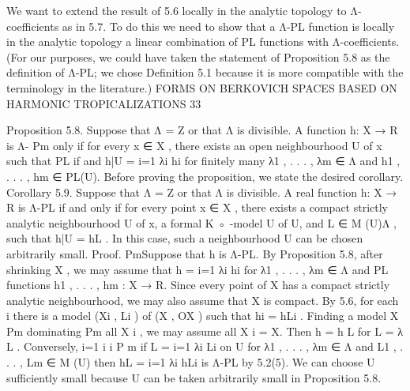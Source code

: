\documentclass[
  10pt,
]{article}
\newenvironment{Shaded}{}{}
\newcommand{\NormalTok}[1]{#1}
\begin{document}
\begin{Shaded}
\begin{Highlighting}[]
\NormalTok{   We want to extend the result of 5.6 locally in the analytic topology to Λ{-}coefficients as}
\NormalTok{in 5.7. To do this we need to show that a Λ{-}PL function is locally in the analytic topology a}
\NormalTok{linear combination of PL functions with Λ{-}coefficients. (For our purposes, we could have}
\NormalTok{taken the statement of Proposition 5.8 as the definition of Λ{-}PL; we chose Definition 5.1}
\NormalTok{because it is more compatible with the terminology in the literature.)}
\NormalTok{                 FORMS ON BERKOVICH SPACES BASED ON HARMONIC TROPICALIZATIONS                             33}

\NormalTok{Proposition 5.8. Suppose that Λ = Z or that Λ is divisible. A function h: X → R is Λ{-}}
\NormalTok{       Pm only if for every x ∈ X , there exists an open neighbourhood U of x such that}
\NormalTok{PL if and}
\NormalTok{h|U = i=1 λi hi for finitely many λ1 , . . . , λm ∈ Λ and h1 , . . . , hm ∈ PL(U).}
\NormalTok{  Before proving the proposition, we state the desired corollary.}
\NormalTok{Corollary 5.9. Suppose that Λ = Z or that Λ is divisible. A real function h: X → R is Λ{-}PL}
\NormalTok{if and only if for every point x ∈ X , there exists a compact strictly analytic neighbourhood}
\NormalTok{U of x, a formal K ◦ {-}model U of U, and L ∈ M (U)Λ , such that h|U = hL . In this case, such a}
\NormalTok{neighbourhood U can be chosen arbitrarily small.}
\NormalTok{Proof.}
\NormalTok{     PmSuppose that h is Λ{-}PL. By Proposition 5.8, after shrinking X , we may assume that}
\NormalTok{h = i=1 λi hi for λ1 , . . . , λm ∈ Λ and PL functions h1 , . . . , hm : X → R. Since every point of}
\NormalTok{X has a compact strictly analytic neighbourhood, we may also assume that X is compact.}
\NormalTok{By 5.6, for each i there is a model (Xi , Li ) of (X , OX ) such that hi = hLi . Finding a model X}
\NormalTok{                                                                              Pm}
\NormalTok{dominating}
\NormalTok{       Pm    all X i , we may   assume  all X i = X. Then  h  =  h  L for L =     λ L . Conversely,}
\NormalTok{                                                                               i=1 i i P}
\NormalTok{                                                                                         m}
\NormalTok{if L = i=1 λi Li on U for λ1 , . . . , λm ∈ Λ and L1 , . . . , Lm ∈ M (U) then hL = i=1 λi hLi is}
\NormalTok{Λ{-}PL by 5.2(5). We can choose U sufficiently small because U can be taken arbitrarily}
\NormalTok{small in Proposition 5.8.                                                                         }

\end{Highlighting}
\end{Shaded}
\end{document}
